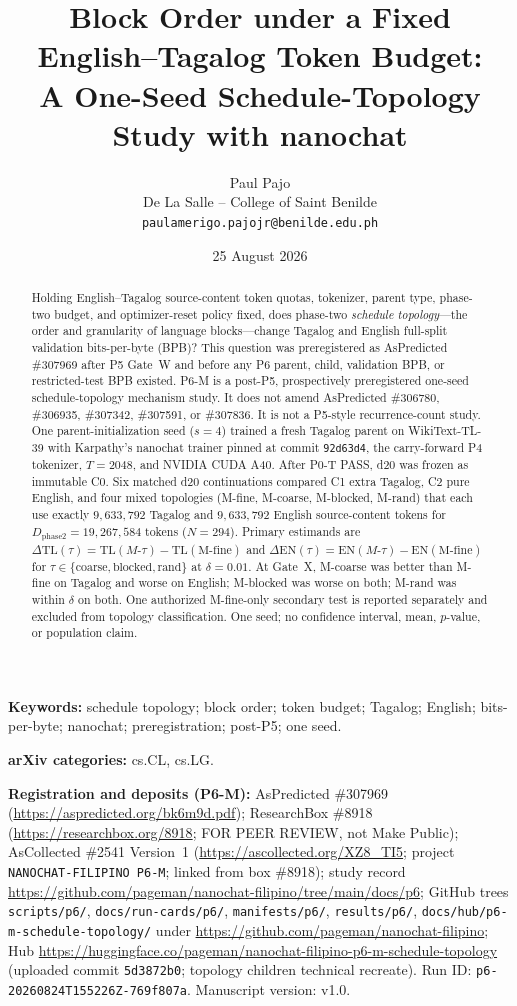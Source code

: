 \documentclass[11pt,a4paper]{article}
\title{Block Order under a Fixed English--Tagalog Token Budget:\\
\large A One-Seed Schedule-Topology Study with nanochat}
\author{Paul Pajo\\
De La Salle -- College of Saint Benilde\\
\texttt{paulamerigo.pajojr@benilde.edu.ph}}
\date{25 August 2026}
\begin{document}
\maketitle

\begin{abstract}
Holding English--Tagalog source-content token quotas, tokenizer, parent type, phase-two budget, and optimizer-reset policy fixed, does phase-two \emph{schedule topology}---the order and granularity of language blocks---change Tagalog and English full-split validation bits-per-byte (BPB)? This question was preregistered as AsPredicted \#307969 after P5 Gate~W and before any P6 parent, child, validation BPB, or restricted-test BPB existed. P6-M is a post-P5, prospectively preregistered one-seed schedule-topology mechanism study. It does not amend AsPredicted \#306780, \#306935, \#307342, \#307591, or \#307836. It is not a P5-style recurrence-count study. One parent-initialization seed ($s=4$) trained a fresh Tagalog parent on WikiText-TL-39 with Karpathy's nanochat trainer pinned at commit \texttt{92d63d4}, the carry-forward P4 tokenizer, $T=2048$, and NVIDIA CUDA A40. After P0-T PASS, d20 was frozen as immutable C0. Six matched d20 continuations compared C1 extra Tagalog, C2 pure English, and four mixed topologies (M-fine, M-coarse, M-blocked, M-rand) that each use exactly $9{,}633{,}792$ Tagalog and $9{,}633{,}792$ English source-content tokens for $D_{\mathrm{phase2}}=19{,}267{,}584$ tokens ($N=294$). Primary estimands are $\Delta\mathrm{TL}(\tau)=\mathrm{TL}(M\textrm{-}\tau)-\mathrm{TL}(\textrm{M-fine})$ and $\Delta\mathrm{EN}(\tau)=\mathrm{EN}(M\textrm{-}\tau)-\mathrm{EN}(\textrm{M-fine})$ for $\tau\in\{\textrm{coarse},\textrm{blocked},\textrm{rand}\}$ at $\delta=0.01$. At Gate~X, M-coarse was better than M-fine on Tagalog and worse on English; M-blocked was worse on both; M-rand was within $\delta$ on both. One authorized M-fine-only secondary test is reported separately and excluded from topology classification. One seed; no confidence interval, mean, $p$-value, or population claim.
\end{abstract}

\noindent\textbf{Keywords:} schedule topology; block order; token budget; Tagalog; English; bits-per-byte; nanochat; preregistration; post-P5; one seed.

\noindent\textbf{arXiv categories:} cs.CL, cs.LG.

\noindent\textbf{Registration and deposits (P6-M):} AsPredicted \#307969 (\url{https://aspredicted.org/bk6m9d.pdf}); ResearchBox \#8918 (\url{https://researchbox.org/8918}; FOR PEER REVIEW, not Make Public); AsCollected \#2541 Version~1 (\url{https://ascollected.org/XZ8_TI5}; project \texttt{NANOCHAT-FILIPINO P6-M}; linked from box \#8918); study record \url{https://github.com/pageman/nanochat-filipino/tree/main/docs/p6}; GitHub trees \texttt{scripts/p6/}, \texttt{docs/run-cards/p6/}, \texttt{manifests/p6/}, \texttt{results/p6/}, \texttt{docs/hub/p6-m-schedule-topology/} under \url{https://github.com/pageman/nanochat-filipino}; Hub \url{https://huggingface.co/pageman/nanochat-filipino-p6-m-schedule-topology} (uploaded commit \texttt{5d3872b0}; topology children technical recreate). Run ID: \texttt{p6-20260824T155226Z-769f807a}. Manuscript version: v1.0.
\end{document}
